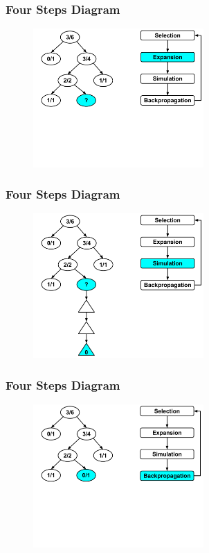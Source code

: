 \documentclass{beamer}
\begin{document}
\begin{frame}[fragile]
\frametitle{Four Steps Diagram}
\begin{figure}[h]
	\includegraphics[width=6.5cm]{Diagrams/MCTSShort/MCTSShortOneTwo.pdf}
	\centering
\end{figure}
\end{frame}

\begin{frame}[fragile]
\frametitle{Four Steps Diagram}
\begin{figure}[h]
	\includegraphics[width=6.5cm]{Diagrams/MCTSShort/MCTSShortOneThree.pdf}
	\centering
\end{figure}
\end{frame}

\begin{frame}[fragile]
\frametitle{Four Steps Diagram}
\begin{figure}[h]
	\includegraphics[width=6.5cm]{Diagrams/MCTSShort/MCTSShortOneFourOne.pdf}
	\centering
\end{figure}
\end{frame}
\end{document}
